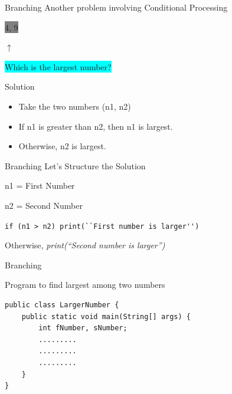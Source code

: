 \documentclass[12pt]{beamer}
\begin{document}
\begin{frame}{Branching}
 Another problem involving Conditional Processing
 
 \begin{center}
 
\colorbox{gray}{\hspace{2.6cm} 4, 9\hspace{2.6cm}}

$\uparrow$
 
\colorbox{cyan}{Which is the largest number?}
  \end{center} 
\begin{block}{Solution}
\begin{itemize}
 \item Take the two numbers (n1, n2)
 \item If n1 is greater than n2, then n1 is largest.
 \item Otherwise, n2 is largest.
 \end{itemize}
\end{block}
 \end{frame}
 
 \begin{frame}{Branching}
  Let's Structure the Solution
  
  \vspace{1pc}
  
  n1 = First Number
  
  n2 = Second Number
  
  \lstinline!if (n1 > n2) print(``First number is larger'')!
  
  Otherwise, \emph{print(``Second number is larger'')}
  
 \end{frame}

\begin{frame}[fragile]{Branching}
 \begin{block}{Program to find largest among two numbers}
  \begin{lstlisting}[numbers=none]
public class LargerNumber {
    public static void main(String[] args) {
        int fNumber, sNumber;
        .........
        .........
        .........
    }
}
  \end{lstlisting}
 \end{block}
\end{frame}
\end{document}
